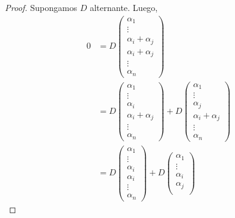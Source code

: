 \documentclass[12pt,a4paper]{book}
\begin{document}
    \begin{proof}
        Supongamos $D$ alternante. Luego,
        \begin{align*}
            0 & = D
            \begin{pmatrix}
                \alpha_1\\
                \vdots\\
                \alpha_{i} + \alpha_j\\
                \alpha_{i} + \alpha_j\\
                \vdots\\
                \alpha_n
            \end{pmatrix}\\
            & = D
            \begin{pmatrix}
                \alpha_1\\
                \vdots\\
                \alpha_{i}\\
                \alpha_{i} + \alpha_j\\
                \vdots\\
                \alpha_n
            \end{pmatrix} + 
            D\begin{pmatrix}
                \alpha_1\\
                \vdots\\
                \alpha_j\\
                \alpha_{i} + \alpha_j\\
                \vdots\\
                \alpha_n
            \end{pmatrix}\\
            & = D
            \begin{pmatrix}
                \alpha_1\\
                \vdots\\
                \alpha_i\\
                \alpha_{i}\\
                \vdots\\
                \alpha_n
            \end{pmatrix} + D
            \begin{pmatrix}
                \alpha_1\\
                \vdots\\
                \alpha_i\\
                \alpha_{j}\\

\end{pmatrix}
\end{align*}
\end{proof}
\end{document}
